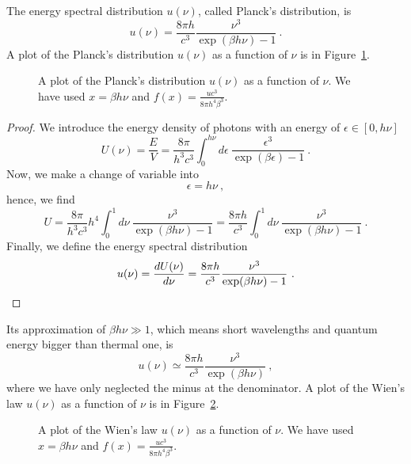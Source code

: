     The energy spectral distribution $u (\nu)$, called Planck's distribution, is 
    \begin{equation}
        u(\nu) = \frac{8 \pi h}{c^3} \frac{\nu^3}{\exp(\beta h \nu) - 1} ~.
    \end{equation}
    A plot of the Planck's distribution $u(\nu)$ as a function of $\nu$ is in Figure~\ref{br:p}.
    \begin{figure}
        \centering
        \caption{A plot of the Planck's distribution $u(\nu)$ as a function of $\nu$. We have used $x = \beta h \nu$ and $f(x) = \frac{u c^3}{8 \pi h^4 \beta^3}$.}
        \label{br:p}
    \end{figure}
    \begin{proof}
        We introduce the energy density of photons with an energy of $\epsilon \in [0, h\nu]$
        \begin{equation}
            U(\nu) = \frac{E}{V} = \frac{8 \pi}{h^3 c^3} \int_0^{h\nu} d\epsilon ~ \frac{\epsilon^3}{\exp(\beta \epsilon) - 1} ~.
        \end{equation}
        Now, we make a change of variable into 
        \begin{equation}
            \epsilon = h \nu ~,
        \end{equation}
        hence, we find 
        \begin{equation*}
            U = \frac{8 \pi}{h^3 c^3} h^4 \int_0^{1} d\nu ~ \frac{\nu^3}{\exp(\beta h \nu) - 1} = \frac{8 \pi h}{c^3} \int_0^{1} d\nu ~ \frac{\nu^3}{\exp(\beta h \nu) - 1} ~.
        \end{equation*}
        Finally, we define the energy spectral distribution 
        \begin{equation}
            u(\nu) = \frac{dU(\nu)}{d\nu} = \frac{8 \pi h}{c^3} \frac{\nu^3}{\exp(\beta h \nu) - 1} ~.
        \end{equation}
    \end{proof}

    Its approximation of $\beta h \nu \gg 1$, which means short wavelengths and quantum energy bigger than thermal one, is 
    \begin{equation}
        u(\nu) \simeq \frac{8 \pi h}{c^3} \frac{\nu^3}{\exp(\beta h \nu)} ~,
    \end{equation}
    where we have only neglected the minus at the denominator. A plot of the Wien's law $u(\nu)$ as a function of $\nu$ is in Figure~\ref{br:w}.
    \begin{figure}
        \centering
        \caption{A plot of the Wien's law $u(\nu)$ as a function of $\nu$. We have used $x = \beta h \nu$ and $f(x) = \frac{u c^3}{8 \pi h^4 \beta^3}$.}
        \label{br:w}
    \end{figure}

